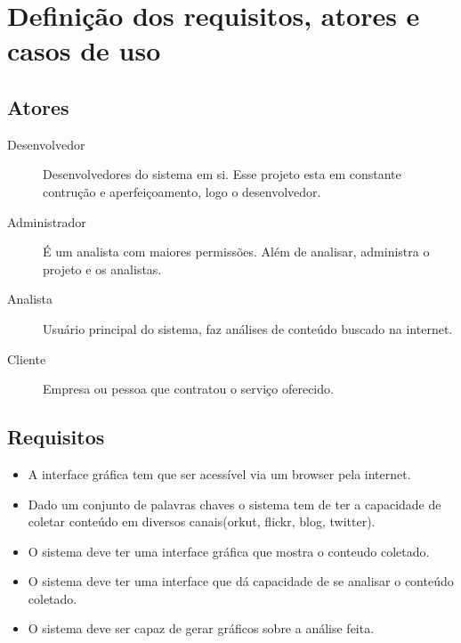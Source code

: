 \chapter{Definição dos requisitos, atores e casos de uso}

\section{Atores}
\begin{description}
    \item[Desenvolvedor] Desenvolvedores do sistema em si. Esse
    projeto esta em constante contrução e aperfeiçoamento, logo o
    desenvolvedor.

    \item[Administrador] É um analista com maiores permissões. Além de
    analisar, administra o projeto e os analistas.

    \item[Analista] Usuário principal do sistema, faz análises de
    conteúdo buscado na internet.

    \item[Cliente] Empresa ou pessoa que contratou o serviço
    oferecido.
\end{description}


\section{Requisitos}
\begin{itemize}
    \item A interface gráfica tem que ser acessível via um browser
    pela internet.
    \item Dado um conjunto de palavras chaves o sistema tem de ter a
    capacidade de coletar conteúdo em diversos canais(orkut, flickr,
            blog, twitter).
    \item O sistema deve ter uma interface gráfica que mostra o
    conteudo coletado.
    \item O sistema deve ter uma interface que dá capacidade de se
    analisar o conteúdo coletado.
    \item O sistema deve ser capaz de gerar gráficos sobre a análise
    feita.
\end{itemize}

